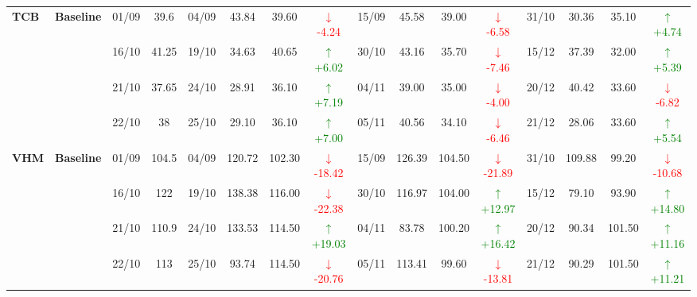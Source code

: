 \documentclass{ieeeaccess}
\begin{document}
{\begin{longtable}{llcc|cccc|cccc|cccc}
\multirow{4}{*}{\textbf{TCB}}
& \textbf{Baseline}
& 01/09 & 39.6 & 04/09 & 43.84 & 39.60 & \textcolor{red}{\(\downarrow\)-4.24} & 15/09 & 45.58 & 39.00 & \textcolor{red}{\(\downarrow\)-6.58} & 31/10 & 30.36 & 35.10 & \textcolor{green}{\(\uparrow\)+4.74} \\
& & 16/10 & 41.25 & 19/10 & 34.63 & 40.65 & \textcolor{green}{\(\uparrow\)+6.02} & 30/10 & 43.16 & 35.70 & \textcolor{red}{\(\downarrow\)-7.46} & 15/12 & 37.39 & 32.00 & \textcolor{green}{\(\uparrow\)+5.39} \\
& & 21/10 & 37.65 & 24/10 & 28.91 & 36.10 & \textcolor{green}{\(\uparrow\)+7.19} & 04/11 & 39.00 & 35.00 & \textcolor{red}{\(\downarrow\)-4.00} & 20/12 & 40.42 & 33.60 & \textcolor{red}{\(\downarrow\)-6.82} \\
& & 22/10 & 38 & 25/10 & 29.10 & 36.10 & \textcolor{green}{\(\uparrow\)+7.00} & 05/11 & 40.56 & 34.10 & \textcolor{red}{\(\downarrow\)-6.46} & 21/12 & 28.06 & 33.60 & \textcolor{green}{\(\uparrow\)+5.54} \\
\midrule

\multirow{4}{*}{\textbf{VHM}}
& \textbf{Baseline}
& 01/09 & 104.5 & 04/09 & 120.72 & 102.30 & \textcolor{red}{\(\downarrow\)-18.42} & 15/09 & 126.39 & 104.50 & \textcolor{red}{\(\downarrow\)-21.89} & 31/10 & 109.88 & 99.20 & \textcolor{red}{\(\downarrow\)-10.68} \\
& & 16/10 & 122 & 19/10 & 138.38 & 116.00 & \textcolor{red}{\(\downarrow\)-22.38} & 30/10 & 116.97 & 104.00 & \textcolor{green}{\(\uparrow\)+12.97} & 15/12 & 79.10 & 93.90 & \textcolor{green}{\(\uparrow\)+14.80} \\
& & 21/10 & 110.9 & 24/10 & 133.53 & 114.50 & \textcolor{green}{\(\uparrow\)+19.03} & 04/11 & 83.78 & 100.20 & \textcolor{green}{\(\uparrow\)+16.42} & 20/12 & 90.34 & 101.50 & \textcolor{green}{\(\uparrow\)+11.16} \\
& & 22/10 & 113 & 25/10 & 93.74 & 114.50 & \textcolor{red}{\(\downarrow\)-20.76} & 05/11 & 113.41 & 99.60 & \textcolor{red}{\(\downarrow\)-13.81} & 21/12 & 90.29 & 101.50 & \textcolor{green}{\(\uparrow\)+11.21} \\
\midrule


\end{longtable}}
\end{document}
